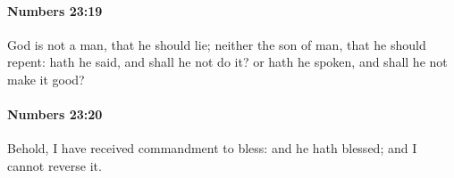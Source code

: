 		\paragraph{Numbers 23:19} %
			\label{NUMBERS-23-19}

			God is not a man, that he should lie; neither the son of man, that he should repent: hath he said, and shall he not do it? or hath he spoken, and shall he not make it good?


		\paragraph{Numbers 23:20} %
			\label{NUMBERS-23-20}

			Behold, I have received commandment to bless: and he hath blessed; and I cannot reverse it.



